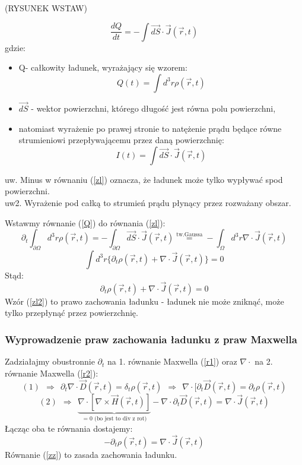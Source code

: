 \documentclass[11pt]{article}
\renewcommand{\r}{\vec{r}}
\renewcommand{\arg}{(\vec{r},t)}
\begin{document}
  (RYSUNEK WSTAW)

  \begin{equation}
  \frac{dQ}{dt}=-\int \vec{dS}\cdot\vec{J}\arg \label{zl}
  \end{equation}
  gdzie: 
  \begin{itemize}
  \item Q- całkowity ładunek, wyrażający się wzorem:
  \begin{equation}Q(t)=\int d^3r \rho\arg \label{Q} \end{equation}
  \item $\vec{dS}$  - wektor powierzchni, którego długość jest równa polu powierzchni, 
  \item natomiast wyrażenie po prawej stronie to natężenie prądu będące równe strumieniowi przepływającemu przez daną powierzchnię:
  \begin{equation}
  I(t)=\int \vec{dS}\cdot\vec{J}\arg 
  \end{equation}
  \end{itemize}
  uw. Minus w równaniu (\ref{zl}) oznacza, że ładunek może tylko wypływać spod powierzchni.\\
  uw2. Wyrażenie pod całką to strumień prądu płynący przez rozważany obszar.

  Wstawmy równanie (\ref{Q}) do równania (\ref{zl}):
  \begin{equation}
  \partial_t \int_{\partial\Omega} d^3r\rho\arg= -\int_{\partial\Omega}\vec{dS}\cdot\vec{J}\arg 
  \stackrel{\text{tw.Gaussa}}{=} -\int_\Omega d^3r\nabla\cdot\vec{J}\arg
  \end{equation}
  \begin{equation}
  \int d^3r\{\partial_t \rho\arg+\nabla \cdot\vec{J}\arg\}=0
  \end{equation}
  Stąd:
  \begin{equation}
  \partial_t \rho\arg+\nabla \cdot\vec{J}\arg=0 \label{zl2} \end{equation}
  Wzór (\ref{zl2}) to prawo zachowania ładunku - ładunek nie może zniknąć, może tylko przepłynąć przez powierzchnię.

  \subsubsection{Wyprowadzenie praw zachowania ładunku z praw Maxwella}
  Zadziałajmy obustronnie $\partial_t$ na 1. równanie Maxwella (\ref{r1}) oraz $\nabla\cdot$ na 2. równanie Maxwella (\ref{r2}):
  \begin{equation}
  (1)~~\Rightarrow ~~\partial_t \nabla\cdot \vec{D}\arg=\delta_t \rho(\r,t) ~~\Rightarrow~~ \nabla\cdot[\partial_t\vec{D}\arg=\partial_t\rho\arg \end{equation}
   \begin{equation}
    (2)~~\Rightarrow~~ \underbrace{\nabla\cdot[\nabla\times\vec{H}\arg]}_{=0 \text{ (bo jest to div z rot)}}-\nabla\cdot\partial_t\vec{D}\arg=\nabla\cdot\vec{J}\arg
	\end{equation}
	Łącząc oba te równania dostajemy:
	\begin{equation}
	-\partial_t\rho\arg=\nabla\cdot\vec{J}\arg \label{zz}
	\end{equation}
	Równanie (\ref{zz}) to zasada zachowania ładunku.
\end{document}
